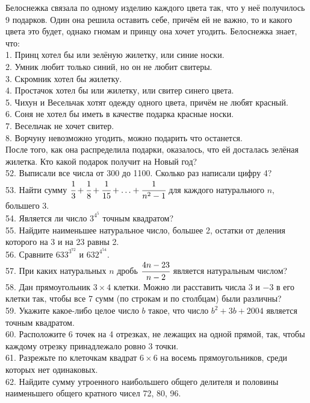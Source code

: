 \documentclass[12pt]{article}
\begin{document}
Белоснежка связала по одному изделию каждого цвета так, что у неё получилось 9 подарков. Один она решила оставить себе, причём ей не важно, то и какого цвета это будет, однако гномам и принцу она хочет угодить. Белоснежка знает, что:\\
1. Принц хотел бы или зелёную жилетку, или синие носки.\\
2. Умник любит только синий, но он не любит свитеры.\\
3. Скромник хотел бы жилетку.\\
4. Простачок хотел бы или жилетку, или свитер синего цвета.\\
5. Чихун и Весельчак хотят одежду одного цвета, причём не любят красный.\\
6. Соня не хотел бы иметь в качестве подарка красные носки.\\
7. Весельчак не хочет свитер.\\
8. Ворчуну невозможно угодить, можно подарить что останется.\\
После того, как она распределила подарки, оказалось, что ей досталась зелёная жилетка. Кто какой подарок получит на Новый год?\\
52. Выписали все числа от 300 до 1100. Сколько раз написали цифру 4?\\
53. Найти сумму $\cfrac{1}{3}+\cfrac{1}{8}+\cfrac{1}{15}+\ldots+\cfrac{1}{n^2-1}$ для каждого натурального $n,$ большего 3.\\
54. Является ли число $3^{4^5}$ точным квадратом?\\
55. Найдите наименьшее натуральное число, большее 2, остатки от деления которого на 3 и на 23 равны 2.\\
56. Сравните $633^{3^{72}}$ и $632^{4^{54}}.$\\
57. При каких натуральных $n$ дробь $\cfrac{4n-23}{n-2}$ является натуральным числом?\\
58. Дан прямоугольник $3 \times 4$ клетки. Можно ли расставить числа $3$ и $-3$ в его клетки так, чтобы все 7 сумм (по строкам и по столбцам) были различны?\\
59. Укажите какое-либо целое число $b$ такое, что число $b^2+3b+2004$ является точным квадратом.\\
60. Расположите 6 точек на 4 отрезках, не лежащих на одной прямой, так, чтобы каждому отрезку принадлежало ровно 3 точки.\\
61. Разрежьте по клеточкам квадрат $6\times 6$ на восемь прямоугольников, среди которых нет одинаковых.\\
62. Найдите сумму утроенного наибольшего общего делителя и половины наименьшего общего кратного чисел 72, 80, 96.\\
\end{document}
